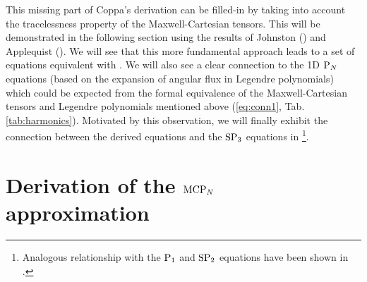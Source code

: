 This missing part of Coppa's derivation can be filled-in by taking into 
account the tracelessness property of the Maxwell-Cartesian tensors. This will be demonstrated in the following
section using the results of Johnston (\cite{Johnston1}) and Applequist (\cite{Applequist1}). We will see that
this more fundamental approach leads to a set of equations equivalent with \cite[Eqn. (42)]{Coppa3}. We will also see a 
clear connection to the 1D $\PN$ equations (based on the expansion of angular flux in Legendre polynomials) which could 
be expected from the formal equivalence of the Maxwell-Cartesian tensors and Legendre polynomials mentioned above 
(\eqref{eq:conn1},
Tab. \ref{tab:harmonics}). Motivated by this observation, we will finally exhibit the
connection between the derived equations and the $\SPN[3]$ equations in \footnote{Analogous
relationship with the $\PN[1]$ and $\SPN[2]$ equations have been shown in \cite{Coppa3}.}.

\section{Derivation of the $\MCPN$ approximation}\label{sec:mcpn}
